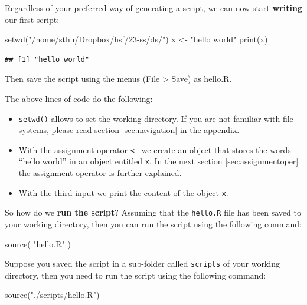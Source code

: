 \documentclass[
  12pt,
  oneside]{book}
\newenvironment{Shaded}{\begin{snugshade}}{\end{snugshade}}
\newcommand{\FunctionTok}[1]{\textcolor[rgb]{0.00,0.00,0.00}{#1}}
\newcommand{\NormalTok}[1]{#1}
\newcommand{\OtherTok}[1]{\textcolor[rgb]{0.56,0.35,0.01}{#1}}
\newcommand{\StringTok}[1]{\textcolor[rgb]{0.31,0.60,0.02}{#1}}
\providecommand{\tightlist}{%
  \setlength{\itemsep}{0pt}\setlength{\parskip}{0pt}}
\begin{document}
Regardless of your preferred way of generating a script, we can now start \textbf{writing} our first script:

\begin{Shaded}
\begin{Highlighting}[]
\FunctionTok{setwd}\NormalTok{(}\StringTok{"/home/sthu/Dropbox/hsf/23{-}ss/ds/"}\NormalTok{)}
\NormalTok{x }\OtherTok{\textless{}{-}} \StringTok{"hello world"}
\FunctionTok{print}\NormalTok{(x)}
\end{Highlighting}
\end{Shaded}

\begin{verbatim}
## [1] "hello world"
\end{verbatim}

Then save the script using the menus (File \textgreater{} Save) as hello.R.

The above lines of code do the following:

\begin{itemize}
\tightlist
\item
  \texttt{setwd()} allows to set the working directory. If you are not familiar with file systems, please read section \ref{sec:navigation} in the appendix.
\item
  With the assignment operator \texttt{\textless{}-} we create an object that stores the words ``hello world'' in an object entitled \texttt{x}. In the next section \ref{sec:assignmentoper} the assignment operator is further explained.
\item
  With the third input we print the content of the object \texttt{x}.
\end{itemize}

So how do we \textbf{run the script}? Assuming that the \texttt{hello.R} file has been saved to your working directory, then you can run the script using the following command:

\begin{Shaded}
\begin{Highlighting}[]
\FunctionTok{source}\NormalTok{( }\StringTok{"hello.R"}\NormalTok{ )}
\end{Highlighting}
\end{Shaded}

Suppose you saved the script in a sub-folder called \texttt{scripts} of your working directory, then you need to run the script using the following command:

\begin{Shaded}
\begin{Highlighting}[]
\FunctionTok{source}\NormalTok{(}\StringTok{"./scripts/hello.R"}\NormalTok{) }
\end{Highlighting}
\end{Shaded}
\end{document}
